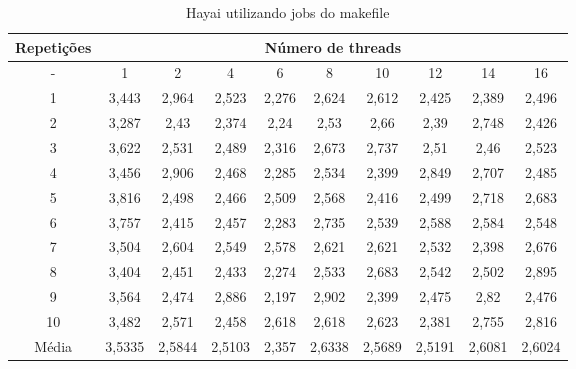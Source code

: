 \begin{table}[h]
\centering
\caption{Hayai utilizando jobs do makefile}
\label{tab:hayai}
\begin{tiny}
\begin{tabular}{cccccccccc}
\toprule
\textbf{Repetições} & \multicolumn{9}{c}{\textbf{Número de threads}} \\ \midrule
- & 1 & 2 & 4 & 6 & 8 & 10 & 12 & 14 & 16 \\ 
1 & 3,443 & 2,964  & 2,523 &2,276 &2,624    & 2,612   &2,425    &2,389  &2,496  \\ 
2 & 3,287 & 2,43   & 2,374 &2,24  &2,53     & 2,66    &2,39     &2,748  &2,426   \\ 
3 & 3,622 & 2,531  & 2,489 &2,316 &2,673    & 2,737   &2,51     &2,46   &2,523 \\ 
4 & 3,456 & 2,906  & 2,468 &2,285 &2,534    & 2,399   &2,849    &2,707  &2,485 \\ 
5 & 3,816 & 2,498  & 2,466 &2,509 &2,568    & 2,416   &2,499    &2,718  &2,683 \\ 
6 & 3,757 & 2,415  & 2,457 &2,283 &2,735    & 2,539   &2,588    &2,584  &2,548 \\ 
7 & 3,504 & 2,604  & 2,549 &2,578 &2,621    & 2,621   &2,532    &2,398  &2,676 \\ 
8 & 3,404 & 2,451  & 2,433 &2,274 &2,533    & 2,683   &2,542    &2,502  &2,895 \\ 
9 & 3,564 & 2,474  & 2,886 &2,197 &2,902    & 2,399   &2,475    &2,82   &2,476 \\ 
10 & 3,482 & 2,571  & 2,458 &2,618 &2,618    & 2,623   &2,381    &2,755  &2,816 \\ \midrule
Média & 3,5335 &  2,5844 & 2,5103 & 2,357 & 2,6338 & 2,5689 & 2,5191 &2,6081 &2,6024 \\ \bottomrule
\end{tabular}
\end{tiny}
\end{table}

